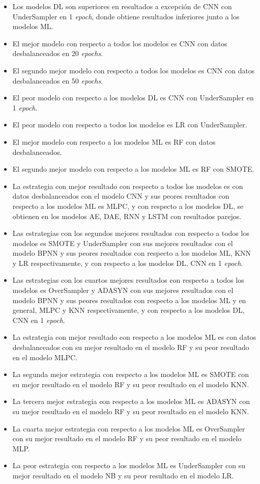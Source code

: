 \begin{itemize}
	\item Los modelos DL son superiores en resultados a excepci\'{o}n de CNN con UnderSampler en 1 \textit{epoch}, donde obtiene resultados inferiores junto a los modelos ML.
	\item El mejor modelo con respecto a todos los modelos es CNN con datos desbalanceados en 20 \textit{epochs}.
	\item El segundo mejor modelo con respecto a todos los modelos es CNN con datos desbalanceados en 50 \textit{epochs}.
	\item El peor modelo con respecto a los modelos DL es CNN con UnderSampler en 1 \textit{epoch}.
	\item El peor modelo con respecto a todos los modelos es LR con UnderSampler.
	\item El mejor modelo con respecto a los modelos ML es RF con datos desbalanceados.
	\item El segundo mejor modelo con respecto a los modelos ML es RF con SMOTE.
	\item La estrategia con mejor resultado con respecto a todos los modelos es con datos desbalanceados con el modelo CNN y sus peores resultados con respecto a los modelos ML es MLPC, y con respecto a los modelos DL, se obtienen en los modelos AE, DAE, RNN y LSTM con resultados parejos.
	\item Las estrategias con los segundos mejores resultados con respecto a todos los modelos es SMOTE y UnderSampler con sus mejores resultados con el modelo BPNN y sus peores resultados con respecto a los modelos ML, KNN y LR respectivamente, y con respecto a los modelos DL, CNN en 1 \textit{epoch}.
	\item Las estrategias con los cuartos mejores resultados con respecto a todos los modelos es OverSampler y ADASYN con sus mejores resultados con el modelo BPNN y sus peores resultados con respecto a los modelos ML y en general, MLPC y KNN respectivamente, y con respecto a los modelos DL, CNN en 1 \textit{epoch}.
	\item La estrategia con mejor resultado con respecto a los modelos ML es con datos desbalanceados con su mejor resultado en el modelo RF y su peor resultado en el modelo MLPC.
	\item La segunda mejor estrategia con respecto a los modelos ML es SMOTE con su mejor resultado en el modelo RF y su peor resultado en el modelo KNN.
	\item La tercera mejor estrategia con respecto a los modelos ML es ADASYN con su mejor resultado en el modelo RF y su peor resultado en el modelo KNN.
	\item La cuarta mejor estrategia con respecto a los modelos ML es OverSampler con su mejor resultado en el modelo RF y su peor resultado en el modelo MLP.
	\item La peor estrategia con respecto a los modelos ML es UnderSampler con su mejor resultado en el modelo NB y su peor resultado en el modelo LR.
\end{itemize}

